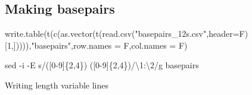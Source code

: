 \documentclass[
]{article}
\newenvironment{Shaded}{\begin{snugshade}}{\end{snugshade}}
\newcommand{\AttributeTok}[1]{\textcolor[rgb]{0.77,0.63,0.00}{#1}}
\newcommand{\DecValTok}[1]{\textcolor[rgb]{0.00,0.00,0.81}{#1}}
\newcommand{\FunctionTok}[1]{\textcolor[rgb]{0.00,0.00,0.00}{#1}}
\newcommand{\NormalTok}[1]{#1}
\newcommand{\StringTok}[1]{\textcolor[rgb]{0.31,0.60,0.02}{#1}}
\begin{document}
\hypertarget{making-basepairs}{%
\subsection{Making basepairs}\label{making-basepairs}}

\begin{Shaded}
\begin{Highlighting}[]
\FunctionTok{write.table}\NormalTok{(}\FunctionTok{t}\NormalTok{(}\FunctionTok{c}\NormalTok{(}\FunctionTok{as.vector}\NormalTok{(}\FunctionTok{t}\NormalTok{(}\FunctionTok{read.csv}\NormalTok{(}\StringTok{"basepairs\_12s.csv"}\NormalTok{,}\AttributeTok{header=}\NormalTok{F)[}\DecValTok{1}\NormalTok{,])))),}\StringTok{"basepairs"}\NormalTok{,}\AttributeTok{row.names =}\NormalTok{ F,}\AttributeTok{col.names =}\NormalTok{ F)}
\end{Highlighting}
\end{Shaded}

\begin{Shaded}
\begin{Highlighting}[]
\FunctionTok{sed} \AttributeTok{{-}i} \AttributeTok{{-}E} \StringTok{\textquotesingle{}s/([0{-}9]\{2,4\}) ([0{-}9]\{2,4\})/\textbackslash{}1:\textbackslash{}2/g\textquotesingle{}}\NormalTok{ basepairs}
\end{Highlighting}
\end{Shaded}

Writing length variable lines
\end{document}
